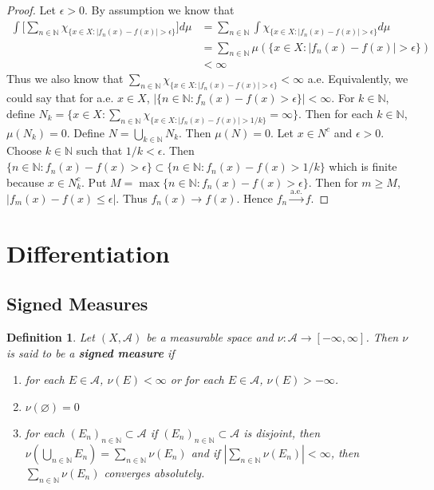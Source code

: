 \documentclass[12pt]{amsart}
\newtheorem{defn}[thm]{Definition}
\newcommand{\ep}{\epsilon}
\newcommand{\N}{\mathbb{N}}
\newcommand{\MA}{\mathcal{A}}
\newcommand{\convt}[1]{\xrightarrow{\text{#1}}}
\begin{document}
\begin{proof}
Let $\ep>0$. By assumption we know that
\begin{align*}
\int \bigg[ \sum_{n \in \N}\chi_{\{x \in X: |f_n(x)-f(x)| > \ep\}}\bigg] d \mu 
&= \sum_{n \in \N}\int \chi_{\{x \in X: |f_n(x)-f(x)| > \ep\}}d \mu\\
&=\sum_{n \in \N}\mu(\{x \in X: |f_n(x)-f(x)| > \ep\})\\
& < \infty
\end{align*}
Thus we also know that $\sum_{n \in \N}\chi_{\{x \in X: |f_n(x)-f(x)| > \ep\}} < \infty$ a.e. Equivalently, we could say that for a.e. $x \in X$, $|\{n \in \N: f_n(x) - f(x) > \ep\}| < \infty$. For $k \in \N$, define $N_k = \{x \in X: \sum_{n \in \N}\chi_{\{x \in X: |f_n(x)-f(x)| > 1/k\}} = \infty\}$. Then for each $k \in \N$, $\mu(N_k) = 0$. Define $N = \bigcup_{k \in \N} N_k$. Then $\mu(N) = 0$. Let $x \in N^c$ and $\ep > 0$. Choose $k \in \N$ such that $1/k < \ep$. Then $\{n \in \N: f_n(x) - f(x) > \ep\} \subset \{n \in \N: f_n(x) - f(x) > 1/k\}$ which is finite because $x \in N_k^c$. Put $M = \max\{n \in \N: f_n(x) - f(x) > \ep\}$. Then for $m \geq M$, $|f_m(x) - f(x) \leq \ep|$. Thus $f_n(x) \rightarrow f(x)$. Hence $f_n \convt{a.e.} f$.
\end{proof}

\section{Differentiation}

\subsection{Signed Measures}

\begin{defn}
Let $(X, \MA)$ be a measurable space and $\nu : \MA \rightarrow [-\infty, \infty]$. Then $\nu$ is said to be a \textbf{signed measure} if 
\begin{enumerate}
\item for each $E \in \MA$, $\nu(E) < \infty$ or for each $E \in \MA$, $\nu(E) > -\infty$.
\item $\nu(\varnothing) = 0$
\item for each $(E_n)_{n \in \N} \subset \MA$ if $(E_n)_{n \in \N} \subset \MA$ is disjoint, then $\nu(\bigcup\limits_{n \in \N} E_n) = \sum\limits_{n \in \N} \nu(E_n)$ and if $|\sum\limits_{n \in \N} \nu(E_n)| < \infty$, then $\sum\limits_{n \in \N} \nu(E_n)$ converges absolutely.
\end{enumerate}
\end{defn}
\end{document}
